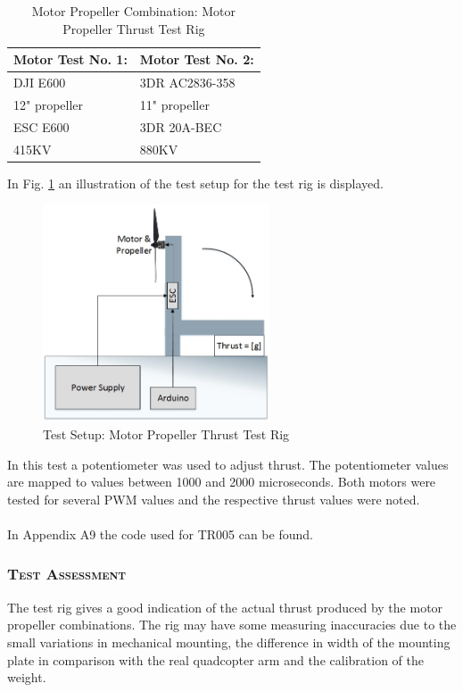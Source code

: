 \begin {table}[H]
    \begin{center}
    \caption {Motor Propeller Combination: Motor Propeller Thrust Test Rig} 
    \label{tab:tabt7} 
    \begin{tabular}{|l|l|}\hline 
        Motor Test No. 1: & Motor Test No. 2:    \\ \hline
        DJI E600 & 3DR AC2836-358   \\ \hline
        12" propeller & 11" propeller \\ \hline
        ESC E600 & 3DR 20A-BEC\\ \hline
        415KV & 880KV\\ \hline
        \end{tabular}
    \end{center}
\end{table}\newpage
\newpage
\noindent In Fig. \ref{fig:TestSetup5} an illustration of the test setup for the test rig is displayed.
\begin{figure}[H]
    \centering
    \includegraphics[width = 0.6\textwidth]{VAPIQ-PICTURES/TestSetup5}
    \caption{Test Setup: Motor Propeller Thrust Test Rig}
    \label{fig:TestSetup5}
\end{figure}
\noindent In this test a potentiometer was used to adjust thrust. The potentiometer values are mapped to values between 1000 and 2000 microseconds. Both motors were tested for several PWM values and the respective thrust values were noted.\\
\\
In Appendix A9 the code used for TR005 can be found. 

\subsubsection*{\textsc{\medium Test Assessment}}
The test rig gives a good indication of the actual thrust produced by the motor propeller combinations. The rig may have some measuring inaccuracies due to the small variations in mechanical mounting, the difference in width of the mounting plate in comparison with the real quadcopter arm and the calibration of the weight.


